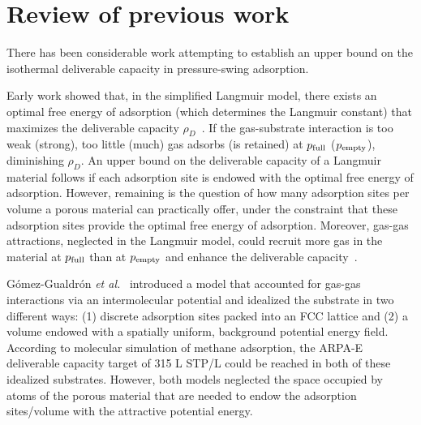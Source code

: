 \section{Review of previous work}
There has been considerable work attempting to establish an upper bound on the
isothermal deliverable capacity in pressure-swing adsorption.

Early work showed that, in the simplified Langmuir model, there exists an
optimal free energy of adsorption (which determines the Langmuir constant) that
maximizes the deliverable capacity
$\rho_D$~\cite{matranga1992storage,bhatia2006optimum,simon2014optimizing}. If
the gas-substrate interaction is too weak (strong), too little (much) gas
adsorbs (is retained) at $p_{\text{full}}$ ($p_{\text{empty}}$), diminishing $\rho_D$. An upper
bound on the deliverable capacity of a Langmuir material follows if each
adsorption site is endowed with the optimal free energy of adsorption. However,
remaining is the question of how many adsorption sites per volume a porous
material can practically offer, under the constraint that these adsorption
sites provide the optimal free energy of adsorption. Moreover, gas-gas
attractions, neglected in the Langmuir model, could recruit more gas in the
material at $p_{\text{full}}$ than at $p_{\text{empty}}$ and enhance the deliverable
capacity~\cite{simon2014optimizing}.

G\'omez-Gualdr\'on \emph{et al.}~\cite{gomez2017impact} introduced a model that
accounted for gas-gas interactions via an intermolecular potential and
idealized the substrate in two different ways: (1) discrete adsorption sites
packed into an FCC lattice and (2) a volume endowed with a spatially uniform,
background potential energy field. According to molecular simulation of methane
adsorption, the ARPA-E deliverable capacity target of 315 L STP/L could be
reached in both of these idealized substrates. However, both models neglected
the space occupied by atoms of the porous material that are needed to endow the
adsorption sites/volume with the attractive potential energy.

